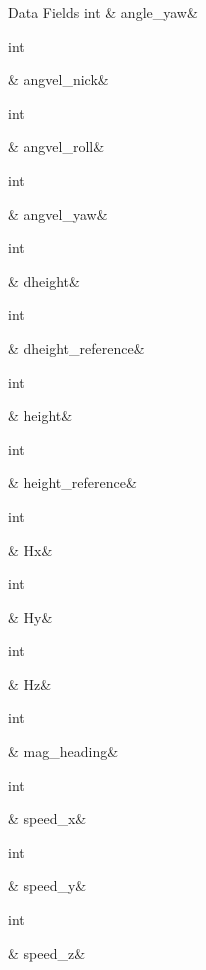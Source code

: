 \begin{DoxyFields}{Data Fields}
\hypertarget{a00004_a7e1ff19efdfcc551a549c8d769bc34c5}{int}\label{a00004_a7e1ff19efdfcc551a549c8d769bc34c5}
&
angle\-\_\-yaw&
\\
\hline

\hypertarget{a00004_ace618a2450b8bd99b2377cf704a1604c}{int}\label{a00004_ace618a2450b8bd99b2377cf704a1604c}
&
angvel\-\_\-nick&
\\
\hline

\hypertarget{a00004_a685764cb37c192579c2acddea33fc3af}{int}\label{a00004_a685764cb37c192579c2acddea33fc3af}
&
angvel\-\_\-roll&
\\
\hline

\hypertarget{a00004_ae0aac64596e8698a3f08c6bd67e5e3dc}{int}\label{a00004_ae0aac64596e8698a3f08c6bd67e5e3dc}
&
angvel\-\_\-yaw&
\\
\hline

\hypertarget{a00004_a454401a27e66ca5856375ef34a112f16}{int}\label{a00004_a454401a27e66ca5856375ef34a112f16}
&
dheight&
\\
\hline

\hypertarget{a00004_a58deb45e3ef00aa81b1b03299acc5923}{int}\label{a00004_a58deb45e3ef00aa81b1b03299acc5923}
&
dheight\-\_\-reference&
\\
\hline

\hypertarget{a00004_ad12fc34ce789bce6c8a05d8a17138534}{int}\label{a00004_ad12fc34ce789bce6c8a05d8a17138534}
&
height&
\\
\hline

\hypertarget{a00004_ae47e65d3c3b86aa787aa7d890b8cdc80}{int}\label{a00004_ae47e65d3c3b86aa787aa7d890b8cdc80}
&
height\-\_\-reference&
\\
\hline

\hypertarget{a00004_a5bd8b970433f692f68235dac221830b1}{int}\label{a00004_a5bd8b970433f692f68235dac221830b1}
&
Hx&
\\
\hline

\hypertarget{a00004_aaf715f851555c840ea562b90494851e3}{int}\label{a00004_aaf715f851555c840ea562b90494851e3}
&
Hy&
\\
\hline

\hypertarget{a00004_a543c6feb7feff64c375d476164793025}{int}\label{a00004_a543c6feb7feff64c375d476164793025}
&
Hz&
\\
\hline

\hypertarget{a00004_ac66ed08857aecb91f07bdc414b445973}{int}\label{a00004_ac66ed08857aecb91f07bdc414b445973}
&
mag\-\_\-heading&
\\
\hline

\hypertarget{a00004_a20fcaf3d7d5effa75ca571510f53a6cc}{int}\label{a00004_a20fcaf3d7d5effa75ca571510f53a6cc}
&
speed\-\_\-x&
\\
\hline

\hypertarget{a00004_a3abd5cb27c81871612651aee8a0476ba}{int}\label{a00004_a3abd5cb27c81871612651aee8a0476ba}
&
speed\-\_\-y&
\\
\hline

\hypertarget{a00004_a8699fea0a4e28198c556231ab49ffcf5}{int}\label{a00004_a8699fea0a4e28198c556231ab49ffcf5}
&
speed\-\_\-z&
\\
\hline

\end{DoxyFields}
